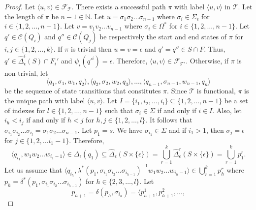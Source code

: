 \begin{proof}
  Let $\langle u, v \rangle \in \mathcal{F}_\mathcal{T}$.
  There exists a successful path $\pi$ with label $\langle u, v \rangle$ in
  $\mathcal{T}$.
  Let the length of $\pi$ be $n-1 \in \mathbb{N}$.
  Let $u = \sigma_1 \sigma_2 \ldots \sigma_{n-1}$ where $\sigma_i \in
  \Sigma_\epsilon$ for $i \in \{ 1, 2, \ldots, n-1 \}$.
  Let $v = v_1 v_2 \ldots v_{n-1}$ where $\sigma_i \in \Omega^*$ for $i \in \{ 1, 2,
  \ldots, n-1 \}$.
  Let $q' \in \mathcal{C}(Q_i)$ and $q'' \in \mathcal{C}(Q_j)$ be respectively the
  start and end states of $\pi$ for $i, j \in \{ 1, 2, \ldots, k \}$.
  If $\pi$ is trivial then $u = v = \epsilon$ and $q' = q'' \in S \cap F$. Thus,
  $q' \in \hat{\Delta}_\epsilon^i(S) \cap F_i'$ and $\psi_i(q'^i) = \epsilon$.
  Therefore, $\langle u, v \rangle \in \mathcal{F}_{\mathcal{T}'}$.
  Otherwise, if $\pi$ is non-trivial, let
  \begin{equation*}
    \langle q_1, \sigma_1, w_1, q_2 \rangle, \langle q_2, \sigma_2, w_2, q_3
    \rangle, \ldots, \langle q_{n-1}, \sigma_{n-1}, w_{n-1}, q_n \rangle
  \end{equation*}
  be the sequence of state transitions that constitutes $\pi$.
  Since $\mathcal{T}$ is functional, $\pi$ is the unique path with label $\langle u,
  v \rangle$.
  Let $I = \{ i_1, i_2, \ldots, i_l \} \subseteq \{ 1, 2, \ldots, n-1 \}$ be a set of
  indexes for $l \in \{ 1, 2, \ldots, n-1 \}$ such that $\sigma_i \in \Sigma$ if and
  only if $i \in I$.
  Also, let $i_h < i_j$ if and only if $h < j$ for $h, j \in \{ 1, 2, \ldots, l \}$.
  It follows that $\sigma_{i_1} \sigma_{i_2} \ldots \sigma_{i_l} = \sigma_1 \sigma_2
  \ldots \sigma_{n-1}$.
  Let $p_1 = s$.
  We have $\sigma_{i_1} \in \Sigma$ and if $i_1 > 1$, then $\sigma_j = \epsilon$ for
  $j \in \{ 1, 2, \ldots i_1-1 \}$.
  Therefore,
  \begin{equation*}
    \langle q_{i_1}, w_1 w_2 \ldots w_{i_1-1} \rangle \in \Delta_\epsilon(q_1)
    \subseteq \hat{\Delta}_\epsilon(S \times \{ \epsilon \}) = \bigcup_{r=1}^k
    \hat{\Delta}_\epsilon^r(S \times \{ \epsilon \}) = \bigcup_{r=1}^k p_1^r.
  \end{equation*}
  Let us assume that $\langle q_{i_h}, \lambda^*(p_1, \sigma_{i_1} \sigma_{i_2}
  \ldots \sigma_{i_{h-1}})^{-1}w_1 w_2 \ldots w_{i_h-1} \rangle \in
  \bigcup_{r=1}^k{p_h^r}$ where $p_h = \delta^*(p_1, \sigma_{i_1} \sigma_{i_2} \ldots
  \sigma_{i_{h-1}})$ for $h \in \{ 2, 3, \ldots, l \}$.
  Let
  \begin{equation*}
    p_{h+1} = \delta(p_h, \sigma_{i_h}) = \langle p_{h+1}^1, p_{h+1}^2, \ldots,

\end{equation*}
\end{proof}

